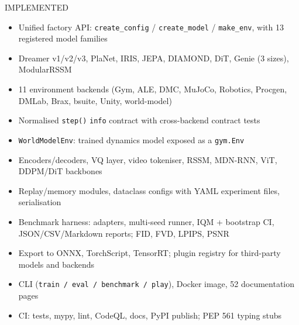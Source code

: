 \documentclass[10pt,a4paper]{article}
\begin{document}
\begin{minipage}[t]{0.325\textwidth}
\begin{tcolorbox}[enhanced,colback=greensoft!45,colframe=green!35,boxrule=0.6pt,arc=2pt,
  left=3mm,right=3mm,top=2.5mm,bottom=2.5mm,height=97mm]
{\displayfont\color{green}\footnotesize IMPLEMENTED}\par\vspace{2mm}
{\scriptsize
\begin{itemize}[label=\textcolor{green}{\scriptsize$\bullet$},leftmargin=3.2mm]
  \item Unified factory API: \texttt{create\_config} / \texttt{create\_model} / \texttt{make\_env}, with 13 registered model families
  \item Dreamer v1/v2/v3, PlaNet, IRIS, JEPA, DIAMOND, DiT, Genie (3 sizes), ModularRSSM
  \item 11 environment backends (Gym, ALE, DMC, MuJoCo, Robotics, Procgen, DMLab, Brax, bsuite, Unity, world-model)
  \item Normalised \texttt{step()} \texttt{info} contract with cross-backend contract tests
  \item \texttt{WorldModelEnv}: trained dynamics model exposed as a \texttt{gym.Env}
  \item Encoders/decoders, VQ layer, video tokeniser, RSSM, MDN-RNN, ViT, DDPM/DiT backbones
  \item Replay/memory modules, dataclass configs with YAML experiment files, serialisation
  \item Benchmark harness: adapters, multi-seed runner, IQM + bootstrap CI, JSON/CSV/Markdown reports; FID, FVD, LPIPS, PSNR
  \item Export to ONNX, TorchScript, TensorRT; plugin registry for third-party models and backends
  \item CLI (\texttt{train\,/\,eval\,/\,benchmark\,/\,play}), Docker image, 52 documentation pages
  \item CI: tests, mypy, lint, CodeQL, docs, PyPI publish; PEP 561 typing stubs
\end{itemize}}
\end{tcolorbox}
\end{minipage}\hfill
\end{document}

